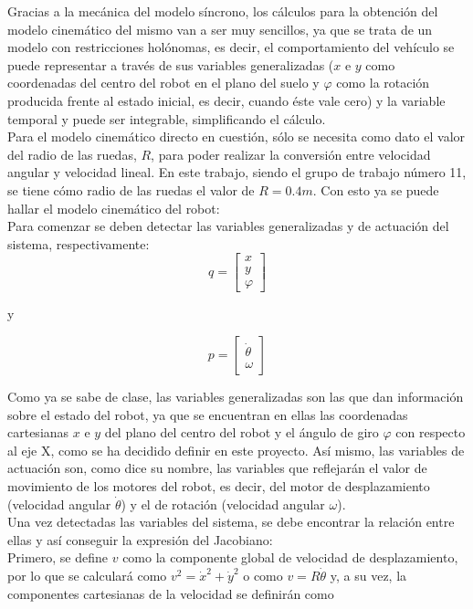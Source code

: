 \documentclass[a4paper,twoside]{article}
\begin{document}
	Gracias a la mecánica del modelo síncrono, los cálculos para la obtención del modelo cinemático del mismo van a ser muy sencillos, ya que se trata de un modelo con restricciones holónomas, es decir, el comportamiento del vehículo se puede representar a través de sus variables generalizadas ($x$ e $y$ como coordenadas del centro del robot en el plano del suelo y $\varphi$ como la rotación producida frente al estado inicial, es decir, cuando éste vale cero) y la variable temporal y puede ser integrable, simplificando el cálculo.\\
	
	Para el modelo cinemático directo en cuestión, sólo se necesita como dato el valor del radio de las ruedas, $R$, para poder realizar la conversión entre velocidad angular y velocidad lineal. En este trabajo, siendo el grupo de trabajo número 11, se tiene cómo radio de las ruedas el valor de $R = 0.4 m$. Con esto ya se puede hallar el modelo cinemático del robot:\\
	
	Para comenzar se deben detectar las variables generalizadas y de actuación del sistema, respectivamente:
		$$
		q=
		\begin{bmatrix}
		x\\y\\\varphi
		\end{bmatrix}
		$$		
		{\centering y \par}
		$$
		p=
		\begin{bmatrix}
		\dot{\theta}\\\omega
		\end{bmatrix}
		$$

	Como ya se sabe de clase, las variables generalizadas son las que dan información sobre el estado del robot, ya que se encuentran en ellas las coordenadas cartesianas $x$ e $y$ del plano del centro del robot y el ángulo de giro $\varphi$ con respecto al eje X, como se ha decidido definir en este proyecto. Así mismo, las variables de actuación son, como dice su nombre, las variables que reflejarán el valor de movimiento de los motores del robot, es decir, del motor de desplazamiento (velocidad angular $\dot{\theta}$) y el de rotación (velocidad angular $\omega$).\\
	
	Una vez detectadas las variables del sistema, se debe encontrar la relación entre ellas y así conseguir la expresión del Jacobiano:\\
	
	Primero, se define $v$ como la componente global de velocidad de desplazamiento, por lo que se calculará como $v^2=\dot{x}^2+\dot{y}^2$ o como $v=R \dot{\theta}$ y, a su vez, la componentes cartesianas de la velocidad se definirán como\par
	
\end{document}
